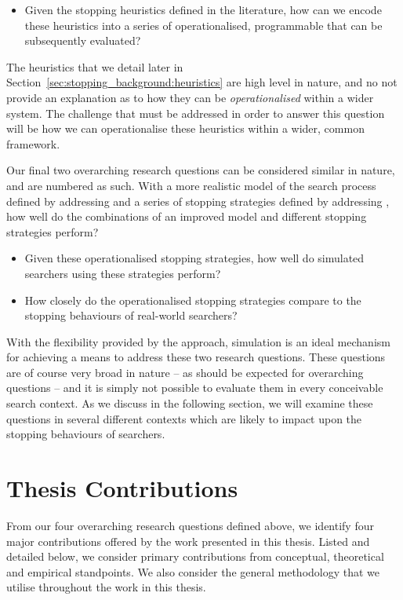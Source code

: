 \begin{itemize}
    \item[]{ Given the stopping heuristics defined in the literature, how can we encode these heuristics into a series of operationalised, programmable  that can be subsequently evaluated?}
\end{itemize}

The heuristics that we detail later in Section~\ref{sec:stopping_background:heuristics} are high level in nature, and no not provide an explanation as to how they can be \emph{operationalised} within a wider system. The challenge that must be addressed in order to answer this question will be how we can operationalise these heuristics within a wider, common framework.

Our final two overarching research questions can be considered similar in nature, and are numbered as such. With a more realistic model of the search process defined by addressing  and a series of stopping strategies defined by addressing , how well do the combinations of an improved model and different stopping strategies perform?

\begin{itemize}
    \item[]{ Given these operationalised stopping strategies, how well do simulated searchers using these strategies perform?}
    \item[]{ How closely do the operationalised stopping strategies compare to the stopping behaviours of real-world searchers?}
\end{itemize}

With the flexibility provided by the approach, simulation is an ideal mechanism for achieving a means to address these two research questions. These questions are of course very broad in nature -- as should be expected for overarching questions -- and it is simply not possible to evaluate them in every conceivable search context. As we discuss in the following section, we will examine these questions in several different contexts which are likely to impact upon the stopping behaviours of searchers.

\section{Thesis Contributions}\label{sec:intro:contribs}
From our four overarching research questions defined above, we identify four major contributions offered by the work presented in this thesis. Listed and detailed below, we consider primary contributions from conceptual, theoretical and empirical standpoints. We also consider the general methodology that we utilise throughout the work in this thesis.

